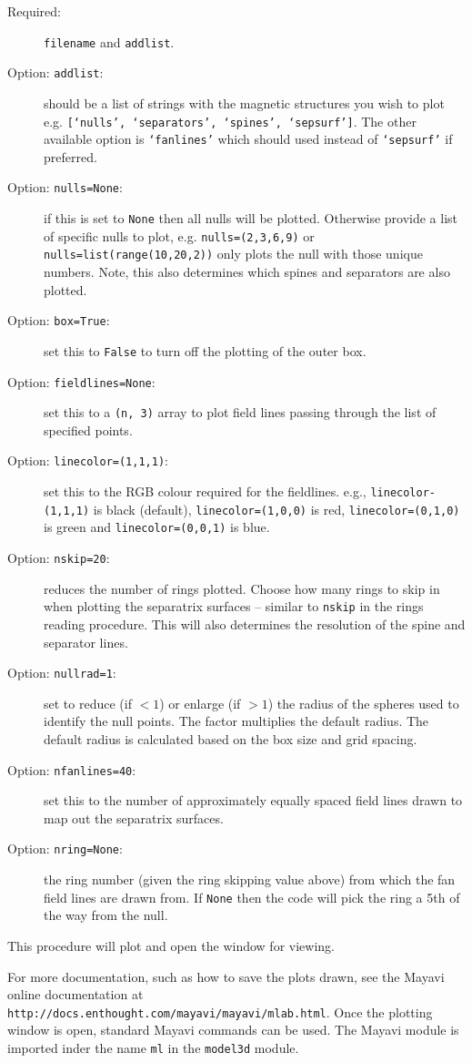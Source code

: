 \documentclass[12pt]{article}
\begin{document}
      \begin{description}
        \item [Required:] \texttt{filename} and \texttt{addlist}.
        \item [Option: \texttt{addlist}:] should be a list of strings with the magnetic structures you wish to plot e.g. \texttt{[`nulls', `separators', `spines', `sepsurf']}. The other available option is \texttt{`fanlines'} which should used instead of \texttt{`sepsurf'} if preferred.
        \item [Option: \texttt{nulls=None}:] if this is set to \texttt{None} then all nulls will be plotted. Otherwise provide a list of specific nulls to plot, e.g. \texttt{nulls=(2,3,6,9)} or \texttt{nulls=list(range(10,20,2))} only plots the null with those unique numbers. Note, this also determines which spines and separators are also plotted.
        \item [Option: \texttt{box=True}:] set this to \texttt{False} to turn off the plotting of the outer box.
        \item [Option: \texttt{fieldlines=None}:] set this to a \texttt{(n, 3)} array to plot field lines passing through the list of specified points.
        \item [Option: \texttt{linecolor=(1,1,1)}:] set this to the RGB colour required for the fieldlines. e.g., \texttt{linecolor-(1,1,1)} is black (default),  \texttt{linecolor=(1,0,0)} is red, \texttt{linecolor=(0,1,0)} is green and \texttt{linecolor=(0,0,1)} is blue.
        \item [Option: \texttt{nskip=20}:] reduces the number of rings plotted. Choose how many rings to skip in when plotting the separatrix surfaces -- similar to \texttt{nskip} in the rings reading procedure. This will also determines the resolution of the spine and separator lines.
        \item [Option: \texttt{nullrad=1}:] set to reduce (if $<1$) or enlarge (if $>1$) the radius of the spheres used to identify the null points. The factor multiplies the default radius. The default radius is calculated based on the box size and grid spacing.
        \item [Option: \texttt{nfanlines=40}:] set this to the number of approximately equally spaced field lines drawn to map out the separatrix surfaces.
        \item [Option: \texttt{nring=None}:] the ring number (given the ring skipping value above) from which the fan field lines are drawn from. If \texttt{None} then the code will pick the ring a 5th of the way from the null.
      \end{description}

      This procedure will plot and open the window for viewing.

      For more documentation, such as how to save the plots drawn, see the Mayavi online documentation at \texttt{http://docs.enthought.com/mayavi/mayavi/mlab.html}. Once the plotting window is open, standard Mayavi commands can be used. The Mayavi module is imported inder the name \texttt{ml} in the \texttt{model3d} module.

  \printbibliography
\end{document}
